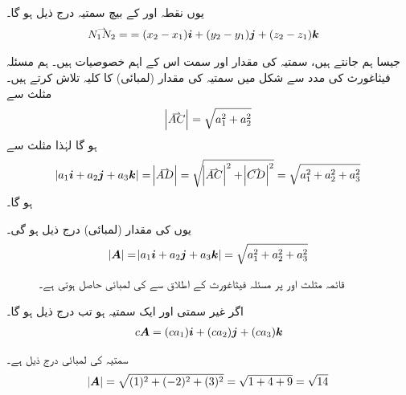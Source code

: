یوں نقطہ  اور  کے بیچ سمتیہ درج ذیل ہو گا۔
\begin{align}
\krightharpoonup{N_1N_2}=&=(x_2-x_1)\ai+(y_2-y_1)\aj+(z_2-z_1)\ak
\end{align}

جیسا ہم جانتے ہیں، سمتیہ کی مقدار اور سمت اس کے اہم خصوصیات ہیں۔ ہم مسئلہ فیثاغورث کی مدد سے شکل  میں  سمتیہ  کی مقدار (لمبائی) کا کلیہ تلاش کرتے ہیں۔ مثلث  سے
\begin{align*}
\abs{\krightharpoonup{AC}}=\sqrt{a_1^2+a_2^2}
\end{align*} 
ہو گا لہٰذا  مثلث  سے
\begin{align*}
\abs{a_1\ai+a_2\aj+a_3\ak}=\abs{\krightharpoonup{AD}}=\sqrt{\abs{\krightharpoonup{AC}}^2+\abs{\krightharpoonup{CD}}^2}=\sqrt{a_1^2+a_2^2+a_3^2}
\end{align*} 
ہو گا۔

یوں  کی مقدار (لمبائی) درج ذیل ہو گی۔
\begin{align}\label{مساوات_سمتیہ_تین_بعدی_مقدار}
\abs{{{\boldsymbol{A}}}}=\abs{a_1{\boldsymbol{i}}+a_2{\boldsymbol{j}}+a_3{\boldsymbol{k}}}=\sqrt{a_1^2+a_2^2+a_3^2}
\end{align}

\begin{figure}
\centering
{}
\caption{قائمہ مثلث  اور  پر مسئلہ فیثاغورث کے اطلاق سے  کی لمبائی حاصل ہوتی ہے۔}
\label{شکل_سمتیہ_مسئلہ_فیثاغورث_لمبائی}
\end{figure}
اگر  غیر سمتی اور  ایک سمتیہ ہو تب درج ذیل ہو گا۔
\begin{align*}
c{{\boldsymbol{A}}}=(ca_1){\boldsymbol{i}}+(ca_2){\boldsymbol{j}}+(ca_3){\boldsymbol{k}}
\end{align*}

سمتیہ  کی لمبائی درج ذیل ہے۔
\begin{align*}
\abs{{{\boldsymbol{A}}}}=\sqrt{(1)^2+(-2)^2+(3)^2}=\sqrt{1+4+9}=\sqrt{14}
\end{align*}

